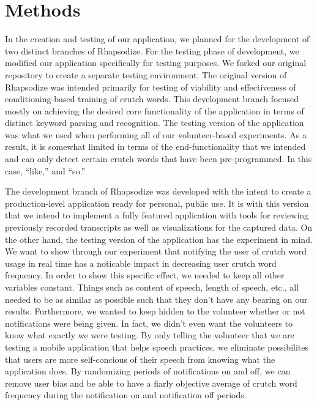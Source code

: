 \documentclass{sigchi}
\begin{document}
\section{Methods}

In the creation and testing of our application, we planned for the development of two distinct branches of Rhapsodize. For the testing phase of development, we modified our application specifically for testing purposes. We forked our original repository to create a separate testing environment. The original version of Rhapsodize was intended primarily for testing of viability and effectiveness of conditioning-based training of crutch words. This development branch focused mostly on achieving the desired core functionality of the application in terms of distinct keyword parsing and recognition. The testing version of the application was what we used when performing all of our volunteer-based experiments. As a result, it is somewhat limited in terms of the end-functionality that we intended and can only detect certain crutch words that have been pre-programmed. In this case, ``like,'' and ``so.''

The development branch of Rhapsodize was developed with the intent to create a production-level application ready for personal, public use. It is with this version that we intend to implement a fully featured application with tools for reviewing previously recorded transcripts as well as visualizations for the captured data. On the other hand, the testing version of the application has the experiment in mind. We want to show through our experiment that notifying the user of crutch word usage in real time has a noticable impact in decreasing user crutch word frequency. In order to show this specific effect, we needed to keep all other variables constant. Things such as content of speech, length of speech, etc., all needed to be as similar as possible such that they don't have any bearing on our results. Furthermore, we wanted to keep hidden to the volunteer whether or not notifications were being given. In fact, we didn't even want the volunteers to know what exactly we were testing. By only telling the volunteer that we are testing a mobile application that helps speech practices, we eliminate possibilites that users are more self-concious of their speech from knowing what the application does. By randomizing periods of notifications on and off, we can remove user bias and be able to have a fiarly objective average of crutch word frequency during the notification on and notification off periods.
\end{document}
